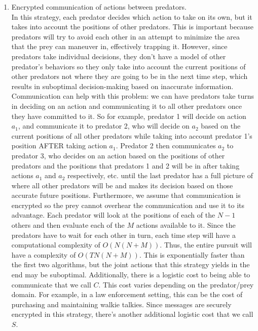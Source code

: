 \documentclass[11pt]{article}
\begin{document}
\begin{multicols}{2}
\begin{enumerate}[leftmargin=0.25cm]
	\item Encrypted communication of actions between predators.\\
	In this strategy, each predator decides which action to take on its own, but it takes into account the positions of other predators. This is important because predators will try to avoid each other in an attempt to minimize the area that the prey can maneuver in, effectively trapping it. However, since predators take individual decisions, they don't have a model of other predator's behaviors so they only take into account the current positions of other predators not where they are going to be in the next time step, which results in suboptimal decision-making based on inaccurate information. Communication can help with this problem: we can have predators take turns in deciding on an action and communicating it to all other predators once they have committed to it. So for example, predator 1 will decide on action $a_1$, and communicate it to predator 2, who will decide on $a_2$ based on the current positions of all other predators while taking into account predator 1's position AFTER taking action $a_1$. Predator 2 then communicates $a_2$ to predator 3, who decides on an action based on the positions of other predators and the positions that predators 1 and 2 will be in after taking actions $a_1$ and $a_2$ respectively, etc. until the last predator has a full picture of where all other predators will be and makes its decision based on those accurate future positions. Furthermore, we assume that communication is encrypted so the prey cannot overhear the communication and use it to its advantage. Each predator will look at the positions of each of the $N-1$ others and then evaluate each of the $M$ actions available to it. Since the predators have to wait for each other in turn, each time step will have a computational complexity of $O(N(N+M))$. Thus, the entire pursuit will have a complexity of $O(TN(N+M))$. This is exponentially faster than the first two algorithms, but the joint actions that this strategy yields in the end may be suboptimal. Additionally, there is a logistic cost to being able to communicate that we call $C$. This cost varies depending on the predator/prey domain. For example, in a law enforcement setting, this can be the cost of purchasing and maintaining walkie talkies. Since messages are securely encrypted in this strategy, there's another additional logistic cost that we call $S$. 
	

\end{enumerate}
\end{multicols}
\end{document}
